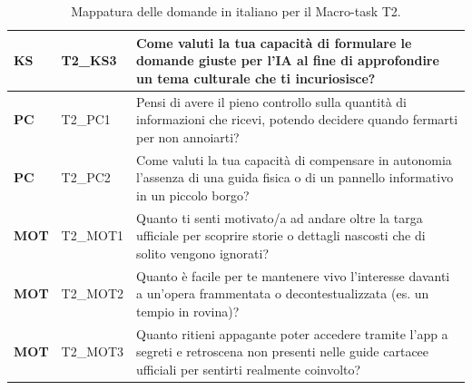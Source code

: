 \begin{table}[H]
\begin{tabular}{
        |>{\centering\arraybackslash\bfseries}p{1.5cm}
        |>{\centering\arraybackslash}p{2.2cm}
        |>{\raggedright\arraybackslash}p{9.8cm}|
    }
        KS & T2\_KS3 & Come valuti la tua capacità di formulare le domande giuste per l'IA al fine di approfondire un tema culturale che ti incuriosisce? \\
        \hline
        \rowcolor{culturiaBeige}
        PC & T2\_PC1 & Pensi di avere il pieno controllo sulla quantità di informazioni che ricevi, potendo decidere quando fermarti per non annoiarti? \\
        \hline
        PC & T2\_PC2 & Come valuti la tua capacità di compensare in autonomia l'assenza di una guida fisica o di un pannello informativo in un piccolo borgo? \\
        \hline
        \rowcolor{culturiaBeige}
        MOT & T2\_MOT1 & Quanto ti senti motivato/a ad andare oltre la targa ufficiale per scoprire storie o dettagli nascosti che di solito vengono ignorati? \\
        \hline
        MOT & T2\_MOT2 & Quanto è facile per te mantenere vivo l'interesse davanti a un'opera frammentata o decontestualizzata (es. un tempio in rovina)? \\
        \hline
        \rowcolor{culturiaBeige}
        MOT & T2\_MOT3 & Quanto ritieni appagante poter accedere tramite l'app a segreti e retroscena non presenti nelle guide cartacee ufficiali per sentirti realmente coinvolto? \\
        \hline
    \end{tabular}
    \vspace{0.15cm}
    \caption{Mappatura delle domande in italiano per il Macro-task T2.}
    \label{tab:domande_t2_it}
\end{table}


